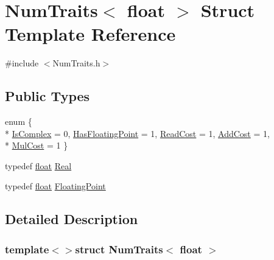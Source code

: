 \hypertarget{struct_num_traits_3_01float_01_4}{\section{Num\-Traits$<$ float $>$ Struct Template Reference}
\label{struct_num_traits_3_01float_01_4}
}


{\ttfamily \#include $<$Num\-Traits.\-h$>$}

\subsection*{Public Types}
\begin{DoxyCompactItemize}
\item 
enum \{ \\*
\hyperlink{struct_num_traits_3_01float_01_4_ab9616ec2eed7df27a2abe117aa70a1c6a737d3ec413d92f3be9dc8f4465839edf}{Is\-Complex} = 0, 
\hyperlink{struct_num_traits_3_01float_01_4_ab9616ec2eed7df27a2abe117aa70a1c6abee2dacb082b77010b2f5a7d5e7078aa}{Has\-Floating\-Point} = 1, 
\hyperlink{struct_num_traits_3_01float_01_4_ab9616ec2eed7df27a2abe117aa70a1c6a824e21a1628f93a1967ab07c727b1a69}{Read\-Cost} = 1, 
\hyperlink{struct_num_traits_3_01float_01_4_ab9616ec2eed7df27a2abe117aa70a1c6abfa6bf69445adef5c2ad97492aace7c9}{Add\-Cost} = 1, 
\\*
\hyperlink{struct_num_traits_3_01float_01_4_ab9616ec2eed7df27a2abe117aa70a1c6a0a527088b0a03e8b58679511fc27591a}{Mul\-Cost} = 1
 \}
\item 
typedef \hyperlink{_super_l_u_support_8h_a6a1bb6ed41f44b60e7bd83b0e9945aa7}{float} \hyperlink{struct_num_traits_3_01float_01_4_a225b66cb1450c9b1f69c63bd96ea8ca7}{Real}
\item 
typedef \hyperlink{_super_l_u_support_8h_a6a1bb6ed41f44b60e7bd83b0e9945aa7}{float} \hyperlink{struct_num_traits_3_01float_01_4_a0305bf3998e6972bc49cf388375333c3}{Floating\-Point}
\end{DoxyCompactItemize}


\subsection{Detailed Description}
\subsubsection*{template$<$$>$struct Num\-Traits$<$ float $>$}



